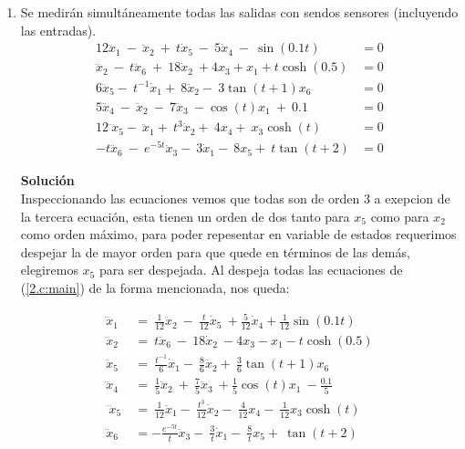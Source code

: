 \documentclass[letterpaper, 12pt]{article}
\begin{document}
\begin{enumerate}
\begin{enumerate}
\item Se medirán simultáneamente todas las salidas con sendos sensores (incluyendo las entradas).
\begin{equation}
\begin{split}
    12{\dddot{x}}_1\ -\ {\ddot{x}}_2\ +\ t{\dot{x}}_5\ -\ 5{\dot{x}}_4\ -\ \sin(0.1t) &=0 \\
    \dddot{x}_2\ -\ t\ddot{x}_6\ +\ 18\dot{x}_2\ + 4x_3 + x_1 + t \cosh(0.5) &= 0 \\
    6{\ddot{x}}_5-\ t^{-1}{\dot{x}}_1+\ 8{\ddot{x}}_2-\ 3\tan(t + 1)x_6 &= 0\\
    5{\dddot{x}}_4\ -\ {\ddot{x}}_2\ -\ 7{\ddot{x}}_3\ -\cos(t)x_1\ +\ 0.1 &= 0 \\ 
    12{\dddot{\ x}}_5-\ {\ddot{x}}_1+\ t^{3}{\dot{x}}_2+\ 4x_4+\ x_3\cosh(t) &=0 \\
    -t{\dddot{x}}_6\ -\ e^{-5t}{\ddot{x}}_3-\ 3{\dot{x}}_1-\ 8x_5+\ t\tan(t + 2) &= 0
    \label{2.c:main}
\end{split}
\end{equation}

\textbf{Solución} \\ 
Inspeccionando las ecuaciones vemos que todas son de orden 3 a exepcion de la tercera ecuación, esta tienen un orden de dos tanto para $x_5$ como para $x_2$ como orden máximo, para poder repesentar en variable de estados requerimos despejar la de mayor orden para que quede en términos de las demás, elegiremos $x_5$ para ser despejada. Al despeja todas las ecuaciones de (\ref{2.c:main}) de la forma mencionada, nos queda:

\begin{equation}
\begin{split}
    {\dddot{x}}_1\ &=\ \frac{1}{12}{\ddot{x}}_2\ -\ \frac{t}{12}{\dot{x}}_5\ +\frac{5}{12}{\dot{x}}_4+ \frac{1}{12} \sin(0.1t)  \\
    \dddot{x}_2\ &= \ t\ddot{x}_6\ -\ 18\dot{x}_2\ - 4x_3 - x_1 - t \cosh(0.5) \\
    {\ddot{x}}_5\ &=\ \frac{t^{-1}}{6}{\dot{x}}_1-\ \frac{8}{6}{\ddot{x}}_2+\ \frac{3}{6}\tan(t + 1)x_6 \\
    {\dddot{x}}_4\ &=\ \frac{1}{5}{\ddot{x}}_2\ +\ \frac{7}{5}{\ddot{x}}_3\ +\frac{1}{5}\cos(t)x_1\ -\frac{0.1}{5}  \\ 
    {\dddot{\ x}}_5\ &=\ \frac{1}{12}{\ddot{x}}_1-\ \frac{t^{3}}{12}{\dot{x}}_2-\ \frac{4}{12}x_4-\ \frac{1}{12}x_3\cosh(t)  \\
    {\dddot{x}}_6\ &= - \frac{e^{-5t}}{t} {\ddot{x}}_3-\ \frac{3}{t}{\dot{x}}_1-\ \frac{8}{t}x_5+\ \tan(t + 2) 
    \label{2.c:despejada}
\end{split}
\end{equation}



\end{enumerate}
\end{enumerate}
\end{document}
